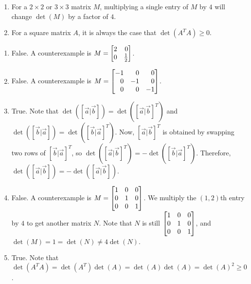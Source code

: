 \begin{exercises}
\begin{problist}
\begin{enumerate}
			\item For a $2\times 2$ or $3\times 3$ matrix $M$, multiplying a single entry of
				$M$ by $4$ will change $\det(M)$ by a factor of $4$.

			\item For a square matrix $A$, it is always the case that $\det(A^TA)\geq 0$.
		\end{enumerate}
        \begin{solution}
        \begin{enumerate}
            \item False. A counterexample is $M=\mat{2 & 0 \\ 0 & \frac{1}{2}}$.
            \item False. A counterexample is $M=\mat{-1 & 0 & 0 \\ 0 & -1 & 0 \\ 0 & 0 & -1}$.
            \item True. Note that $\det([\vec a|\vec b])=\det([\vec a|\vec b]^T)$ and $\det([\vec b|\vec a])=\det([\vec b|\vec a]^T)$. Now, $[\vec a|\vec b]^T$ is obtained by swapping two rows of $[\vec b|\vec a]^T$, so $\det([\vec a|\vec b]^T)=-\det([\vec b|\vec a]^T)$. Therefore, $\det([\vec a|\vec b])=-\det([\vec a|\vec b])$.
            \item False. A counterexample is $M=\mat{1 & 0 & 0 \\ 0 & 1 & 0 \\ 0 & 0 & 1}$. We multiply the $(1,2)$th entry by $4$ to get another matrix $N$. Note that $N$ is still $\mat{1 & 0 & 0 \\ 0 & 1 & 0 \\ 0 & 0 & 1 }$, and $\det(M)=1=\det(N)\ne 4\det(N)$.
            \item True. Note that $\det(A^T A)=\det(A^T)\det(A)=\det(A)\det(A)=\det(A)^2\ge 0$.
        \end{enumerate}
        \end{solution}
	\end{problist}
\end{exercises}
